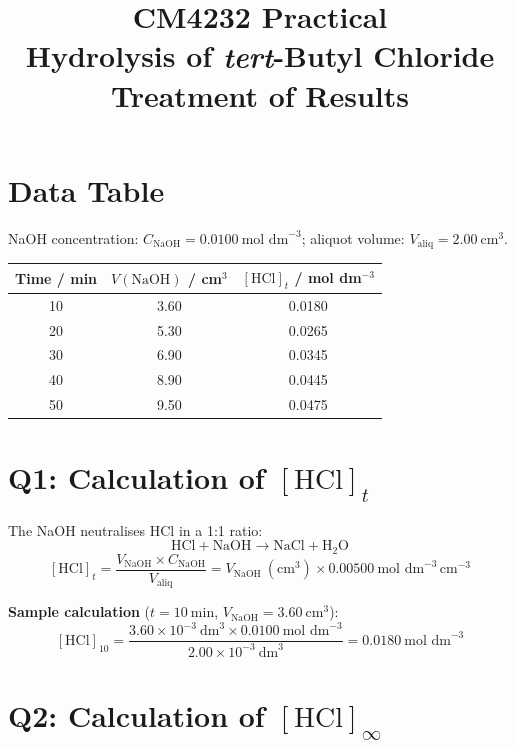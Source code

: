 \documentclass[12pt,a4paper]{article}
\title{\textbf{CM4232 Practical}\\Hydrolysis of \textit{tert}-Butyl Chloride\\Treatment of Results}
\author{}
\date{}
\begin{document}
\maketitle
\thispagestyle{empty}

\section*{Data Table}

NaOH concentration: $C_\text{NaOH} = 0.0100\ \text{mol dm}^{-3}$; aliquot volume: $V_\text{aliq} = 2.00\ \text{cm}^3$.

\begin{center}
\begin{tabular}{ccc}
\toprule
Time / min & $V(\text{NaOH})$ / cm$^3$ & $[\text{HCl}]_t$ / mol dm$^{-3}$ \\
\midrule
10  & 3.60  & 0.0180 \\
20  & 5.30  & 0.0265 \\
30  & 6.90  & 0.0345 \\
40  & 8.90  & 0.0445 \\
50 & 9.50  & 0.0475 \\
\bottomrule
\end{tabular}
\end{center}

\section*{Q1: Calculation of $[\text{HCl}]_t$}

The NaOH neutralises HCl in a 1:1 ratio:
\[
  \text{HCl} + \text{NaOH} \longrightarrow \text{NaCl} + \text{H}_2\text{O}
\]
\[
  [\text{HCl}]_t
  = \frac{V_\text{NaOH} \times C_\text{NaOH}}{V_\text{aliq}}
  = V_\text{NaOH}\ (\text{cm}^3) \times 0.00500\ \text{mol dm}^{-3}\,\text{cm}^{-3}
\]

\textbf{Sample calculation} ($t = 10\ \text{min}$, $V_\text{NaOH} = 3.60\ \text{cm}^3$):
\[
  [\text{HCl}]_{10}
  = \frac{3.60 \times 10^{-3}\ \text{dm}^3 \times 0.0100\ \text{mol dm}^{-3}}
         {2.00 \times 10^{-3}\ \text{dm}^3}
  = 0.0180\ \text{mol dm}^{-3}
\]

\section*{Q2: Calculation of $[\text{HCl}]_\infty$}
\end{document}
